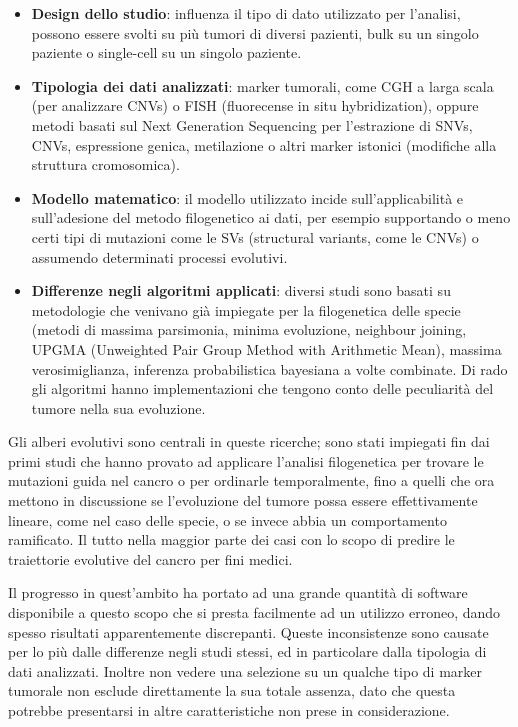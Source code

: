 \documentclass[a4paper]{article}
\begin{document}
	\begin{itemize}
	\item \textbf{Design dello studio}: influenza il tipo di dato utilizzato per l'analisi, possono essere svolti su più tumori
	di diversi pazienti, bulk su un singolo paziente o single-cell su un singolo paziente.
	\item \textbf{Tipologia dei dati analizzati}: marker tumorali, come CGH a larga scala (per analizzare CNVs) o FISH
	(fluorecense in situ hybridization), oppure metodi basati sul Next Generation Sequencing per
	l'estrazione di SNVs, CNVs, espressione genica, metilazione o altri marker istonici (modifiche alla
	struttura cromosomica).
	\item \textbf{Modello matematico}: il modello utilizzato incide sull'applicabilità e sull'adesione del metodo filogenetico
	ai dati, per esempio supportando o meno certi tipi di mutazioni come le SVs (structural variants, come
	le CNVs) o assumendo determinati processi evolutivi.
	\item \textbf{Differenze negli algoritmi applicati}: diversi studi sono basati su metodologie che venivano già
	impiegate per la filogenetica delle specie (metodi di massima parsimonia, minima evoluzione,
	neighbour joining, UPGMA (Unweighted Pair Group Method with Arithmetic Mean), massima
	verosimiglianza, inferenza probabilistica bayesiana a volte combinate. Di rado gli algoritmi hanno
	implementazioni che tengono conto delle peculiarità del tumore nella sua evoluzione.
	\end{itemize}

	Gli alberi evolutivi sono centrali in queste ricerche; sono stati impiegati fin dai primi studi che hanno
	provato ad applicare l'analisi filogenetica per trovare le mutazioni guida nel cancro o per ordinarle
	temporalmente, fino a quelli che ora mettono in discussione se l'evoluzione del tumore possa essere
	effettivamente lineare, come nel caso delle specie, o se invece abbia un comportamento ramificato. Il tutto
	nella maggior parte dei casi con lo scopo di predire le traiettorie evolutive del cancro per fini medici.
	
	Il progresso in quest'ambito ha portato ad una grande quantità di software disponibile a questo scopo che si presta facilmente 
	ad un utilizzo erroneo, dando spesso risultati apparentemente discrepanti. Queste inconsistenze sono causate per lo più dalle
	differenze negli studi stessi, ed in particolare dalla tipologia di dati analizzati. Inoltre non vedere una selezione su un 
	qualche tipo di marker tumorale non esclude direttamente la sua totale assenza, dato che questa potrebbe presentarsi in 
	altre caratteristiche non prese in considerazione.   
\end{document}
